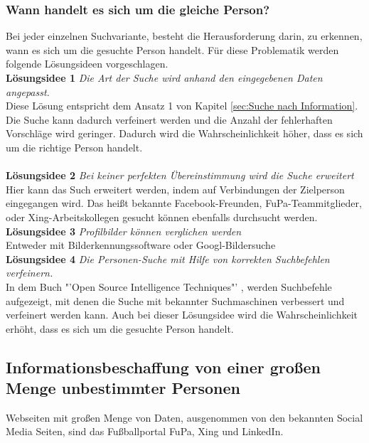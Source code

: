 		\subsubsection{Wann handelt es sich um die gleiche Person?}
		Bei jeder einzelnen Suchvariante, besteht die Herausforderung darin, zu erkennen, wann es sich um die gesuchte Person handelt. Für diese Problematik werden folgende Lösungsideen vorgeschlagen.\\
		
		{\bf Lösungsidee 1} \textit{Die Art der Suche wird anhand den eingegebenen Daten angepasst.}\\
		Diese Lösung entspricht dem Ansatz 1 von Kapitel \ref{sec:Suche nach Information}. Die Suche kann dadurch verfeinert werden und die Anzahl der fehlerhaften Vorschläge wird geringer. Dadurch wird die Wahrscheinlichkeit höher, dass es sich um die richtige Person handelt.\\\\
		{\bf Lösungsidee 2} \textit{Bei keiner perfekten Übereinstimmung wird die Suche erweitert}\\
		Hier kann das Such erweitert werden, indem auf Verbindungen der Zielperson eingegangen wird. Das heißt bekannte Facebook-Freunden, FuPa-Teammitglieder, oder Xing-Arbeitskollegen gesucht können ebenfalls durchsucht werden.\\
		
		{\bf Lösungsidee 3} \textit{Profilbilder können verglichen werden}\\ Entweder mit Bilderkennungssoftware oder Googl-Bildersuche\\
		
		{\bf Lösungsidee 4} \textit{Die Personen-Suche mit Hilfe von korrekten Suchbefehlen verfeinern.}\\
		In dem Buch "'Open Source Intelligence Techniques"' \cite{Bazzell}, werden Suchbefehle aufgezeigt, mit denen die Suche mit bekannter Suchmaschinen verbessert und verfeinert werden kann. Auch bei dieser Lösungsidee wird die Wahrscheinlichkeit erhöht, dass es sich um die gesuchte Person handelt. %
		
	\subsection{Informationsbeschaffung von einer großen Menge unbestimmter Personen}
	Webseiten mit großen Menge von Daten, ausgenommen von den bekannten Social Media Seiten, sind das Fußballportal FuPa, Xing und LinkedIn.
	
